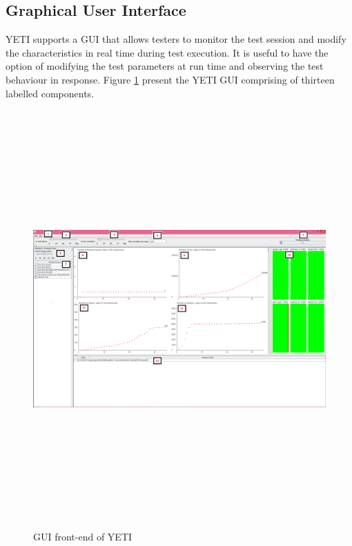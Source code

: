 \subsection{Graphical User Interface}
YETI supports a GUI that allows testers to monitor the test session and modify the characteristics in real time during test execution. It is useful to have the option of modifying the test parameters at run time and observing the test behaviour in response. Figure \ref{fig:yetiGUI_3} present the YETI GUI comprising of thirteen labelled components.


\begin{figure}
\centering
\centerline{\includegraphics[width=23cm,height=16cm]{chapter3/yetiGUI.png}}
\caption{GUI front-end of YETI}
\label{fig:yetiGUI_3}
\end{figure}



